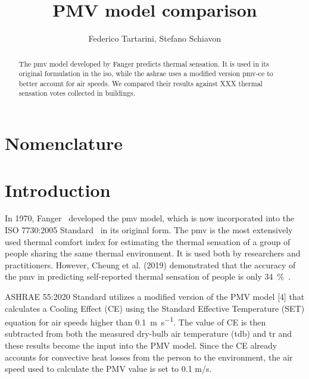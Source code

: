 \documentclass[11pt]{article}
\title{PMV model comparison}
\author{Federico Tartarini, Stefano Schiavon}
\begin{document}
    \maketitle

    \begin{abstract}
        The \ac{pmv} model developed by Fanger predicts thermal sensation.
        It is used in its original formulation in the \gls{iso}, while the \gls{ashrae} uses a modified version \acs{pmv-ce} to better account for air speeds.
        We compared their results against XXX thermal sensation votes collected in buildings.
    \end{abstract}

    \section*{Nomenclature}
    

    \section{Introduction}\label{sec:introduction}
    In 1970, Fanger~\cite{Fanger1970} developed the \ac{pmv} model, which is now incorporated into the ISO 7730:2005 Standard~\cite{iso7730} in its original form.
    The \ac{pmv} is the most extensively used thermal comfort index for estimating the thermal sensation of a group of people sharing the same thermal environment.
    It is used both by researchers and practitioners.
    However, Cheung et al. (2019) demonstrated that the accuracy of the \ac{pmv} in predicting self-reported thermal sensation of people is only \qty{34}{\percent}~\cite{Cheung2019}.

    ASHRAE 55:2020 Standard utilizes a modified version of the PMV model [4] that calculates a Cooling Effect (CE) using the Standard Effective Temperature (SET) equation for air speeds higher than \qty{0.1}{\m\per\s}.
    The value of CE is then subtracted from both the measured dry-bulb air temperature (tdb) and \ac{tr} and these results become the input into the PMV model.
    Since the CE already accounts for convective heat losses from the person to the environment, the air speed used to calculate the PMV value is set to 0.1 m/s.

    \printbibliography
\end{document}
